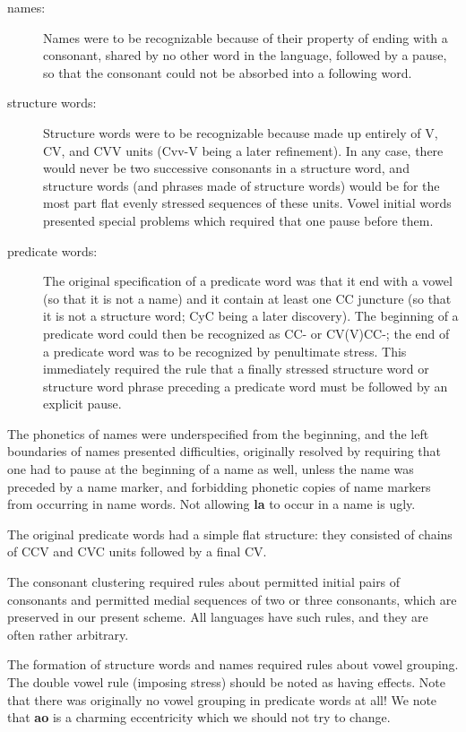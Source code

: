 \documentclass[12pt]{book}
\begin{document}
\begin{description}

\item[names:]  Names were to be recognizable because of their property of ending with a consonant, shared by no other word in the language, followed by a pause, so that the consonant could not be absorbed into a following word.

\item[structure words:]  Structure words were to be recognizable because made up entirely of V, CV, and CVV units (Cvv-V being a later refinement).  In any case, there would never
be two successive consonants in a structure word, and structure words (and phrases made of structure words) would be for the most part flat evenly stressed sequences of these units.
Vowel initial words presented special problems which required that one pause before them.

\item[predicate words:]  The original specification of a predicate word was that it end with a vowel (so that it is not a name) and it contain at least one CC juncture (so that it is not a structure word;  CyC being a later discovery).  The beginning of a predicate word could then be recognized as CC- or CV(V)CC-;  the end of a predicate word was to be recognized by penultimate stress.  This immediately required the rule that
a finally stressed structure word or structure word phrase preceding a predicate word must be followed by an explicit pause.

\end{description}

The phonetics of names were underspecified from the beginning, and the left boundaries of names presented difficulties, originally resolved by requiring that one had to pause at the
beginning of a name as well, unless the name was preceded by a name marker, and forbidding phonetic copies of name markers from occurring in name words.  Not allowing {\bf la} to occur in a  name is ugly.

The original predicate words had a simple flat structure:  they consisted of chains of CCV and CVC units followed by a final CV.

The consonant clustering required rules about permitted initial pairs of consonants and permitted medial sequences of two or three consonants, which are preserved in our present scheme.  All languages have such rules, and they are often rather arbitrary.

The formation of structure words and names  required rules about vowel grouping.  The double vowel rule (imposing stress) should be noted as having effects.  Note that there was originally no vowel grouping in predicate words at all!  We note that {\bf ao} is a charming eccentricity which we should not try to change.
\end{document}
